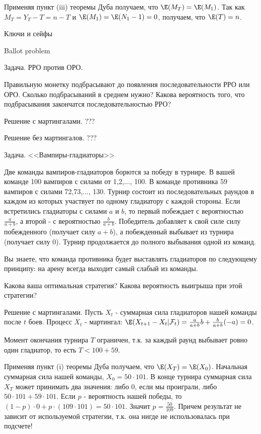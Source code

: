 {Применяя пункт (iii) теоремы Дуба получаем, что $\E(M_{T})=\E(M_{1})$. Так как $M_{T}=Y_{T}-T=n-T$ и $\E(M_{1})=\E(N_{1}-1)=0$, получаем, что $\E(T)=n$.

Ключи и сейфы \cite{aops:keys} %

Ballot problem \cite{ross:scp} %




Задача. РРО против ОРО\cite{li:ma}. %

Правильную монетку подбрасывают до появления последовательности РРО или ОРО. Сколько подбрасываний в среднем нужно? Какова вероятность того, что подбрасывания закончатся последовательностью РРО?

Решение с мартингалами. ???

Решение без мартингалов. ???



Задача. <<Вампиры-гладиаторы>> \cite{winkler:gpdp} %

Две команды вампиров-гладиаторов борются за победу в турнире. В вашей команде 100 вампиров с силами от 1,2,..., 100. В команде противника 59 вампиров с силами 72,73,..., 130. Турнир состоит из последовательных раундов в каждом из которых участвует по одному гладиатору с каждой стороны. Если встретились гладиаторы с силами $a$ и $b$, то первый побеждает с вероятностью $\frac{a}{a+b}$, а второй - с вероятностью $\frac{b}{a+b}$. Победитель добавляет к свой силе силу побежденного (получает силу $a+b$), а побежденный выбывает из турнира (получает силу $0$). Турнир продолжается до полного выбывания одной из команд.

Вы знаете, что команда противника будет выставлять гладиаторов по следующему принципу: на арену всегда выходит самый слабый из команды.

Какова ваша оптимальная стратегия? Какова вероятность выигрыша при этой стратегии?

Решение с мартингалами. Пусть $X_{t}$ - суммарная сила гладиаторов нашей команды после $t$ боев. Процесс $X_{t}$ - мартингал: $\E(X_{t+1}-X_{t}|\mathcal{F}_{t})=\frac{a}{a+b}b+\frac{b}{a+b}(-a)=0$.

Момент окончания турнира $T$ ограничен, т.к. за каждый раунд выбывает ровно один гладиатор, то есть $T<100+59$.

Применяя пункт (i) теоремы Дуба получаем, что $\E(X_{T})=\E(X_{0})$. Начальная суммарная сила нашей команды, $X_{0}=50\cdot 101$. В конце турнира суммарная сила $X_{T}$ может принимать два значения: либо 0, если мы проиграли, либо $50\cdot 101+59\cdot 101$. Если $p$ - вероятность нашей победы, то $(1-p)\cdot 0+p\cdot (109\cdot 101)=50\cdot 101$. Значит $p=\frac{50}{109}$. Причем результат не зависит от используемой стратегии, т.к. она нигде не использовалась при подсчете!




}
